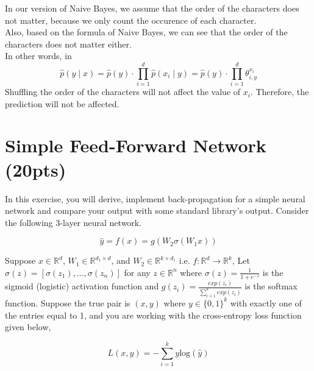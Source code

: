 \documentclass[a4paper]{article}
\theoremstyle{definition}
\newenvironment{soln}{
    \leavevmode\color{blue}\ignorespaces
}{}
\begin{document}
\begin{enumerate}
	      \begin{soln}
		      In our version of Naive Bayes, we assume that the order of the characters does not matter, because we only count the occurence of each character.\\
		      Also, based on the formula of Naive Bayes, we can see that the order of the characters does not matter either.\\

		      In other words, in
		      \[
			      \hat p(y \mid x) = \hat p(y) \cdot \prod_{i=1}^d \hat p(x_i \mid y)
			      =\hat p(y) \cdot  \prod_{i=1}^d \theta_{i, y}^{x_i}
		      \]
		      Shuffling the order of the characters will not affect the value of $x_i$. Therefore, the prediction will not be affected.
	      \end{soln}

\end{enumerate}

\section{Simple Feed-Forward Network (20pts)}
In this exercise, you will derive, implement back-propagation for a simple neural network and compare your output with some standard library’s output. Consider the following 3-layer neural network.

\[
	\hat{y} = f(x) = g(W_2\sigma(W_1x))
\]

Suppose $x \in \mathbb{R}^d$, $W_1 \in \mathbb{R}^{d_1 \times d}$, and $W_2 \in \mathbb{R}^{k \times d_1}$ i.e. $f: \mathbb{R}^d \rightarrow \mathbb{R}^k$, Let $\sigma(z) = [\sigma(z_1), ..., \sigma(z_n)]$ for any $z \in \mathbb{R}^n$ where $\sigma(z) = \frac{1}{1 + e^{-z}}$ is the sigmoid (logistic) activation function and $g(z_i) = \frac{exp(z_i)}{\sum_{i=1}^k exp(z_i)}$ is the softmax function. Suppose the true pair is $(x, y)$ where $y \in \{0, 1\}^k$ with exactly one of the entries equal to 1, and you are working with the cross-entropy loss function given below,

\[
	L(x, y) = -\sum_{i=1}^k y \text{log}(\hat{y})
\]
\end{document}

